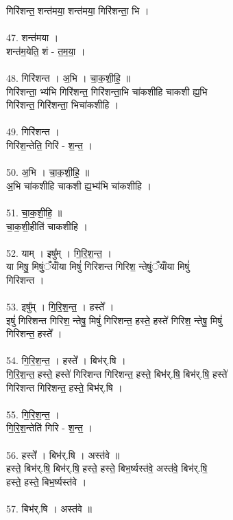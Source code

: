 गिरि॑शन्त॒ शन्त॑मया॒ शन्त॑मया॒ गिरि॑शन्ता॒ भि ।\\
\\
47. शन्त॑मया ।\\
शन्त॑म॒येति॒ शं - त॒म॒या॒ ।\\
\\
48. गिरि॑शन्त । अ॒भि । चा॒क॒शी॒हि॒ ॥\\
गिरि॑शन्ता॒ भ्य॑भि गिरि॑शन्त॒ गिरि॑शन्ता॒भि चा॑कशीहि चाकशी ह्य॒भि\\
गिरि॑शन्त॒ गिरि॑शन्ता॒ भिचा॑कशीहि ।\\
\\
49. गिरि॑शन्त ।\\
गिरि॑श॒न्तेति॒ गिरि॑ - श॒न्त॒ ।\\
\\
50. अ॒भि । चा॒क॒शी॒हि॒ ॥\\
अ॒भि चा॑कशीहि चाकशी ह्य॒भ्य॑भि चा॑कशीहि ।\\
\\
51. चा॒क॒शी॒हि॒ ॥\\
चा॒क॒शी॒हीति॑ चाकशीहि ।\\
\\
52. याम् । इषु᳚म् । गि॒रि॒श॒न्त॒ ।\\
या मिषु॒ मिषुं॒ँयांँया मिषुं॑ गिरिशन्त गिरिश॒ न्तेषुं॒ँयांँया मिषुं॑\\
गिरिशन्त ।\\
\\
53. इषु᳚म् । गि॒रि॒श॒न्त॒ । हस्ते᳚ ।\\
इषुं॑ गिरिशन्त गिरिश॒ न्तेषु॒ मिषुं॑ गिरिशन्त॒ हस्ते॒ हस्ते॑ गिरिश॒ न्तेषु॒ मिषुं॑\\
गिरिशन्त॒ हस्ते᳚ ।\\
\\
54. गि॒रि॒श॒न्त॒ । हस्ते᳚ । बिभ॑र्.षि ।\\
गि॒रि॒श॒न्त॒ हस्ते॒ हस्ते॑ गिरिशन्त गिरिशन्त॒ हस्ते॒ बिभ॑र्.षि॒ बिभ॑र्.षि॒ हस्ते॑\\
गिरिशन्त गिरिशन्त॒ हस्ते॒ बिभ॑र्.षि ।\\
\\
55. गि॒रि॒श॒न्त॒ ।\\
गि॒रि॒श॒न्तेति॑ गिरि - श॒न्त॒ ।\\
\\
56. हस्ते᳚ । बिभ॑र्.षि । अस्त॑वे ॥\\
हस्ते॒ बिभ॑र्.षि॒ बिभ॑र्.षि॒ हस्ते॒ हस्ते॒ बिभ॒र्ष्यस्त॑वे॒ अस्त॑वे॒ बिभ॑र्.षि॒\\
हस्ते॒ हस्ते॒ बिभ॒र्ष्यस्त॑वे ।\\
\\
57. बिभ॑र्.षि । अस्त॑वे ॥\\
